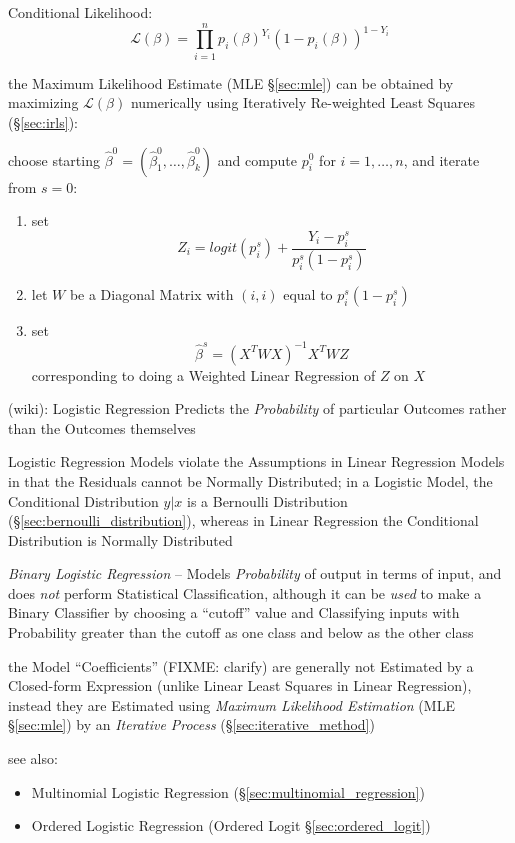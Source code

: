 Conditional Likelihood:
\[
  \mathcal{L}(\beta) = \prod_{i=1}^n p_i(\beta)^{Y_i} (1 - p_i(\beta))^{1-Y_i}
\]

the Maximum Likelihood Estimate (MLE \S\ref{sec:mle}) can be obtained by
maximizing $\mathcal{L}(\beta)$ numerically using Iteratively Re-weighted Least
Squares (\S\ref{sec:irls}):

choose starting $\hat{\beta}^0 = (\hat{\beta}_1^0, \ldots, \hat{\beta}_k^0)$
and compute $p_i^0$ for $i = 1, \ldots, n$, and iterate from $s = 0$:
\begin{enumerate}
  \item set
    \[
      Z_i = logit(p_i^s) + \frac{Y_i - p_i^s}{p_i^s(1 - p_i^s)}
    \]
  \item let $W$ be a Diagonal Matrix with $(i,i)$ equal to $p_i^s(1 - p_i^s)$
  \item set
    \[
      \hat{\beta}^s = (X^T W X)^{-1} X^T W Z
    \]
  corresponding to doing a Weighted Linear Regression of $Z$ on $X$
\end{enumerate}

(wiki): Logistic Regression Predicts the \emph{Probability} of particular
Outcomes rather than the Outcomes themselves

Logistic Regression Models violate the Assumptions in Linear Regression Models
in that the Residuals cannot be Normally Distributed; in a Logistic Model, the
Conditional Distribution $y | x$ is a Bernoulli Distribution
(\S\ref{sec:bernoulli_distribution}), whereas in Linear Regression the
Conditional Distribution is Normally Distributed

\emph{Binary Logistic Regression} -- Models \emph{Probability} of output in
terms of input, and does \emph{not} perform Statistical Classification, although
it can be \emph{used} to make a Binary Classifier by choosing a ``cutoff'' value
and Classifying inputs with Probability greater than the cutoff as one class and
below as the other class

the Model ``Coefficients'' (FIXME: clarify) are generally not Estimated by a
Closed-form Expression (unlike Linear Least Squares in Linear Regression),
instead they are Estimated using \emph{Maximum Likelihood Estimation} (MLE
\S\ref{sec:mle}) by an \emph{Iterative Process} (\S\ref{sec:iterative_method})

see also:
\begin{itemize}
  \item Multinomial Logistic Regression (\S\ref{sec:multinomial_regression})
  \item Ordered Logistic Regression (Ordered Logit \S\ref{sec:ordered_logit})
\end{itemize}

